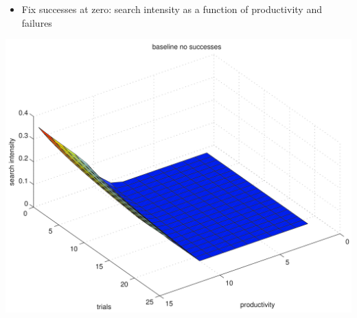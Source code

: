 \documentclass[notes=show]{beamer}
\begin{document}
\begin{frame}%


\begin{itemize}
\item Fix successes at zero: search intensity as a function of productivity and failures
\end{itemize}

\includegraphics[scale=0.07]{figs/baseline_policy_no_suc.png}

\end{frame}%
\end{document}
